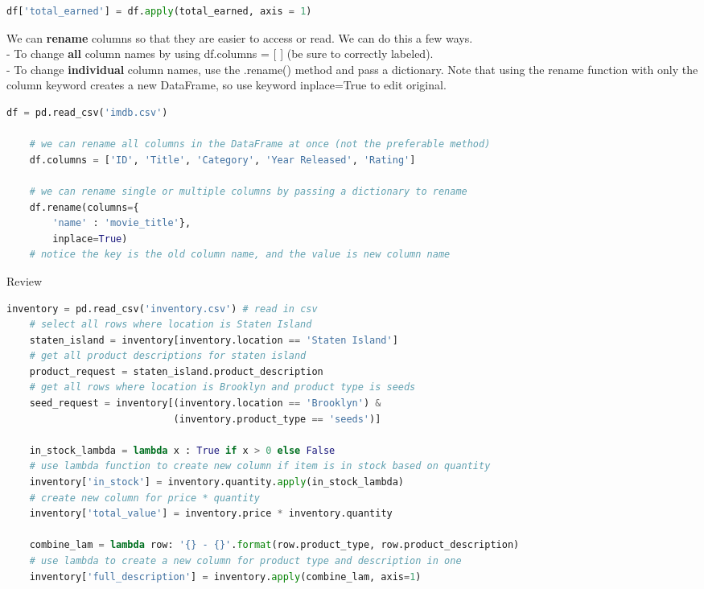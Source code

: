 \documentclass[11pt, a4paper]{article}
\begin{document}
\begin{spacing}{1.1}
\begin{lstlisting}[language=Python]
	df['total_earned'] = df.apply(total_earned, axis = 1) \end{lstlisting}\vspace*{1mm}
	We can \textbf{rename} columns so that they are easier to access or read. We can do this a few ways. \\
	\hspace*{4mm} - To change \textbf{all} column names by using df.columns = [ ] (be sure to correctly labeled). \\
	\hspace*{4mm} - To change \textbf{individual} column names, use the .rename() method and pass a dictionary. Note that \hspace*{7mm} using the rename function with only the column keyword creates a new DataFrame, so use keyword \hspace*{7mm} inplace=True to edit original.
	\begin{lstlisting}[language=Python]
	df = pd.read_csv('imdb.csv')
	
	# we can rename all columns in the DataFrame at once (not the preferable method)
	df.columns = ['ID', 'Title', 'Category', 'Year Released', 'Rating']
	
	# we can rename single or multiple columns by passing a dictionary to rename
	df.rename(columns={
		'name' : 'movie_title'},
		inplace=True)
	# notice the key is the old column name, and the value is new column name \end{lstlisting}\vspace*{1mm}
	Review
	\begin{lstlisting}[language=Python]
	inventory = pd.read_csv('inventory.csv') # read in csv
	# select all rows where location is Staten Island
	staten_island = inventory[inventory.location == 'Staten Island']
	# get all product descriptions for staten island
	product_request = staten_island.product_description 
	# get all rows where location is Brooklyn and product type is seeds
	seed_request = inventory[(inventory.location == 'Brooklyn') & 
	                         (inventory.product_type == 'seeds')]
	
	in_stock_lambda = lambda x : True if x > 0 else False 
	# use lambda function to create new column if item is in stock based on quantity
	inventory['in_stock'] = inventory.quantity.apply(in_stock_lambda)
	# create new column for price * quantity
	inventory['total_value'] = inventory.price * inventory.quantity 
	
	combine_lam = lambda row: '{} - {}'.format(row.product_type, row.product_description)
	# use lambda to create a new column for product type and description in one
	inventory['full_description'] = inventory.apply(combine_lam, axis=1) \end{lstlisting} \newpage

\end{spacing}
\end{document}
